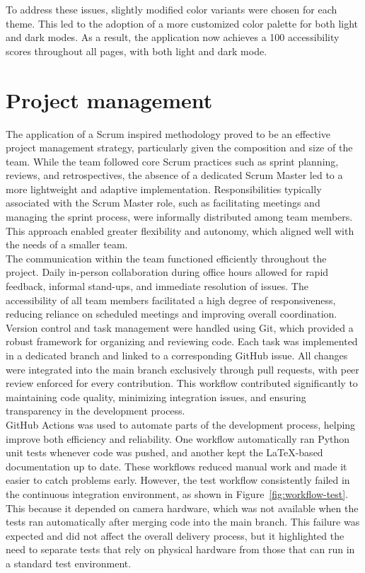 To address these issues, slightly modified color variants were chosen for each theme. This led to the adoption of a more customized color palette for both light and dark modes. As a result, the application now achieves a 100 accessibility scores throughout all pages, with both light and dark mode. 

\section{Project management}
\label{sec:discussion-project-management}

The application of a Scrum inspired methodology proved to be an effective project management strategy, particularly given the composition and size of the team. While the team followed core Scrum practices such as sprint planning, reviews, and retrospectives, the absence of a dedicated Scrum Master led to a more lightweight and adaptive implementation. Responsibilities typically associated with the Scrum Master role, such as facilitating meetings and managing the sprint process, were informally distributed among team members. This approach enabled greater flexibility and autonomy, which aligned well with the needs of a smaller team. \\

The communication within the team functioned efficiently throughout the project. Daily in-person collaboration during office hours allowed for rapid feedback, informal stand-ups, and immediate resolution of issues. The accessibility of all team members facilitated a high degree of responsiveness, reducing reliance on scheduled meetings and improving overall coordination.\\

Version control and task management were handled using Git, which provided a robust framework for organizing and reviewing code. Each task was implemented in a dedicated branch and linked to a corresponding GitHub issue. All changes were integrated into the main branch exclusively through pull requests, with peer review enforced for every contribution. This workflow contributed significantly to maintaining code quality, minimizing integration issues, and ensuring transparency in the development process. \\

GitHub Actions was used to automate parts of the development process, helping improve both efficiency and reliability. One workflow automatically ran Python unit tests whenever code was pushed, and another kept the LaTeX-based documentation up to date. These workflows reduced manual work and made it easier to catch problems early. However, the test workflow consistently failed in the continuous integration environment, as shown in Figure~\ref{fig:workflow-test}. This because it depended on camera hardware, which was not available when the tests ran automatically after merging code into the main branch. This failure was expected and did not affect the overall delivery process, but it highlighted the need to separate tests that rely on physical hardware from those that can run in a standard test environment. \\

